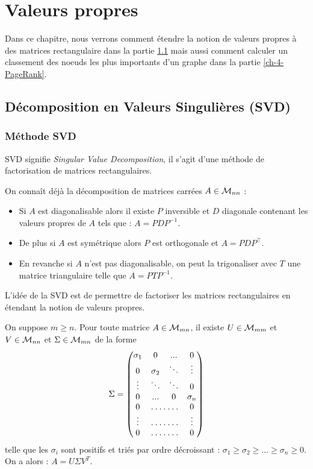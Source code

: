 \chapter{Valeurs propres}
\label{ch-4}

	Dans ce chapitre, nous verrons comment étendre la notion de valeurs propres à des matrices rectangulaire dans la partie \ref{ch-4-SVD} mais aussi comment calculer un classement des noeuds les plus importants d'un graphe dans la partie \ref{ch-4-PageRank}.

\section{Décomposition en Valeurs Singulières (SVD)}
\label{ch-4-SVD}

	\subsection{Méthode SVD}
		SVD signifie \emph{Singular Value Decomposition}, il s'agit d'une méthode de factorisation de matrices rectangulaires.

		On connaît déjà la décomposition de matrices carrées $A\in\mathcal{M}_{nn}$ :
		\begin{itemize}
			\item Si $A$ est diagonalisable alors il existe $P$ inversible et $D$ diagonale contenant les valeurs propres de $A$ tels que : $A = PDP^{-1}$.
			\item De plus si $A$ est symétrique alors $P$ est orthogonale et $A=PDP^\top$.
			\item En revanche si $A$ n'est pas diagonalisable, on peut la trigonaliser avec $T$ une matrice triangulaire telle que $A=PTP^{-1}$.
		\end{itemize}

		L'idée de la SVD est de permettre de factoriser les matrices rectangulaires en étendant la notion de valeurs propres.

		\begin{theoreme}
			\label{th-4-svd}
			On suppose $m \geq n$.
			Pour toute matrice $A \in \mathcal{M}_{mn}$, il existe $U \in \mathcal{M}_{mm}$ et $V \in \mathcal{M}_{nn}$ et $\Sigma \in \mathcal{M}_{mn}$ de la forme
			$$
				\Sigma = \begin{pmatrix}
							\sigma_1 & 0 & ... & 0			\\
							0 & \sigma_2 & \ddots & \vdots	\\
							\vdots & \ddots & \ddots & 0	\\
							0 & ... & 0 & \sigma_n			\\
							0 & \hdotsfor{2} & 0			\\
							\vdots & \hdotsfor{2} & \vdots 	\\
							0 & \hdotsfor{2} & 0
						\end{pmatrix}
			$$ telle que les $\sigma_i$ sont positifs et triés par ordre décroissant : $\sigma_1 \geq \sigma_2 \geq ... \geq \sigma_n \geq 0$.
			On a alors : $A = U\Sigma V^T$.
		\end{theoreme}

